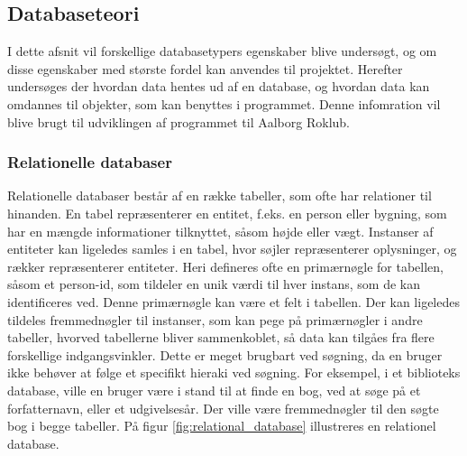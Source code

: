 \subsection{Databaseteori}
\label{sec:teori_database}
I dette afsnit vil forskellige databasetypers egenskaber blive undersøgt, og om disse egenskaber med største fordel kan anvendes til projektet. Herefter undersøges der hvordan data hentes ud af en database, og hvordan data kan omdannes til objekter, som kan benyttes i programmet. Denne infomration vil blive brugt til udviklingen af programmet til Aalborg Roklub.

\subsubsection{Relationelle databaser}
Relationelle databaser består af en række tabeller, som ofte har relationer til hinanden. En tabel repræsenterer en entitet, f.eks. en person eller bygning, som har en mængde informationer tilknyttet, såsom højde eller vægt. Instanser af entiteter kan ligeledes samles i en tabel, hvor søjler repræsenterer oplysninger, og rækker repræsenterer entiteter. Heri defineres ofte en primærnøgle for tabellen, såsom et person-id, som tildeler en unik værdi til hver instans, som de kan identificeres ved. Denne primærnøgle kan være et felt i tabellen. Der kan ligeledes tildeles fremmednøgler til instanser, som kan pege på primærnøgler i andre tabeller, hvorved tabellerne bliver sammenkoblet, så data kan tilgåes fra flere forskellige indgangsvinkler. Dette er meget brugbart ved søgning, da en bruger ikke behøver at følge et specifikt hieraki ved søgning. For eksempel, i et biblioteks database, ville en bruger være i stand til at finde en bog, ved at søge på et forfatternavn, eller et udgivelsesår. Der ville være fremmednøgler til den søgte bog i begge tabeller.\cite{database_hvad} På figur \ref{fig:relational_database} illustreres en relationel database.



